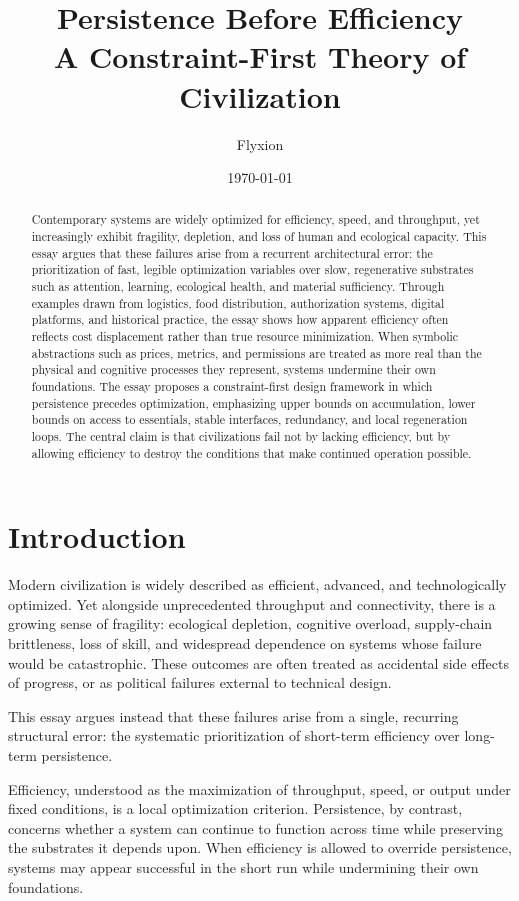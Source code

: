 \documentclass[12pt]{article} \usepackage[margin=1in]{geometry} \usepackage{setspace} \usepackage{amsmath,amssymb} \usepackage{hyperref}
\title{\textbf{Persistence Before Efficiency}\\ \large A Constraint-First Theory of Civilization} \author{Flyxion}
\date{\today}
\begin{document}
\maketitle 

\begin{abstract}
Contemporary systems are widely optimized for efficiency, speed, and throughput, yet increasingly exhibit fragility, depletion, and loss of human and ecological capacity. This essay argues that these failures arise from a recurrent architectural error: the prioritization of fast, legible optimization variables over slow, regenerative substrates such as attention, learning, ecological health, and material sufficiency. Through examples drawn from logistics, food distribution, authorization systems, digital platforms, and historical practice, the essay shows how apparent efficiency often reflects cost displacement rather than true resource minimization. When symbolic abstractions such as prices, metrics, and permissions are treated as more real than the physical and cognitive processes they represent, systems undermine their own foundations. The essay proposes a constraint-first design framework in which persistence precedes optimization, emphasizing upper bounds on accumulation, lower bounds on access to essentials, stable interfaces, redundancy, and local regeneration loops. The central claim is that civilizations fail not by lacking efficiency, but by allowing efficiency to destroy the conditions that make continued operation possible.
\end{abstract}

\newpage
\section{Introduction} 

Modern civilization is widely described as efficient, advanced, and technologically optimized. Yet alongside unprecedented throughput and connectivity, there is a growing sense of fragility: ecological depletion, cognitive overload, supply-chain brittleness, loss of skill, and widespread dependence on systems whose failure would be catastrophic. These outcomes are often treated as accidental side effects of progress, or as political failures external to technical design.

This essay argues instead that these failures arise from a single, recurring structural error: the systematic prioritization of short-term efficiency over long-term persistence.

Efficiency, understood as the maximization of throughput, speed, or output under fixed conditions, is a local optimization criterion. Persistence, by contrast, concerns whether a system can continue to function across time while preserving the substrates it depends upon. When efficiency is allowed to override persistence, systems may appear successful in the short run while undermining their own foundations.
\end{document}
